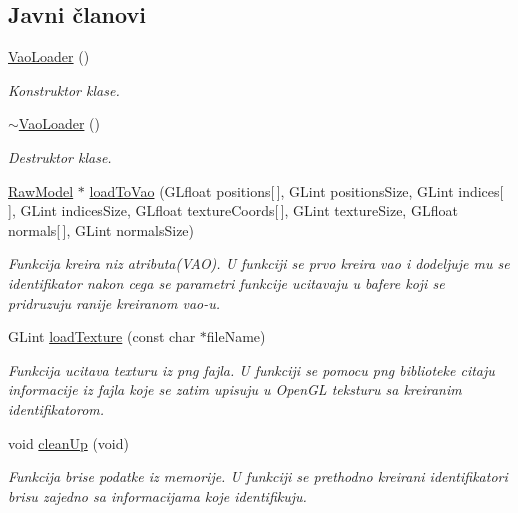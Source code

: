 \subsection*{Javni članovi}
\begin{DoxyCompactItemize}
\item 
\hyperlink{classcore_1_1VaoLoader_ab025be7312c274b9737b19d308bd5845}{Vao\+Loader} ()
\begin{DoxyCompactList}\small\item\em Konstruktor klase. \end{DoxyCompactList}\item 
\hyperlink{classcore_1_1VaoLoader_a1b522bb4b83dbe751783fee04ac712d3}{$\sim$\+Vao\+Loader} ()
\begin{DoxyCompactList}\small\item\em Destruktor klase. \end{DoxyCompactList}\item 
\hyperlink{classmodel_1_1RawModel}{Raw\+Model} $\ast$ \hyperlink{classcore_1_1VaoLoader_a61e0aea1c2f59726a2ea8ba323d32b67}{load\+To\+Vao} (G\+Lfloat positions\mbox{[}$\,$\mbox{]}, G\+Lint positions\+Size, G\+Lint indices\mbox{[}$\,$\mbox{]}, G\+Lint indices\+Size, G\+Lfloat texture\+Coords\mbox{[}$\,$\mbox{]}, G\+Lint texture\+Size, G\+Lfloat normals\mbox{[}$\,$\mbox{]}, G\+Lint normals\+Size)
\begin{DoxyCompactList}\small\item\em Funkcija kreira niz atributa(\+V\+A\+O). U funkciji se prvo kreira vao i dodeljuje mu se identifikator nakon cega se parametri funkcije ucitavaju u bafere koji se pridruzuju ranije kreiranom vao-\/u. \end{DoxyCompactList}\item 
G\+Lint \hyperlink{classcore_1_1VaoLoader_aeefd4de3346c1036d8d7249694fd404d}{load\+Texture} (const char $\ast$file\+Name)
\begin{DoxyCompactList}\small\item\em Funkcija ucitava texturu iz png fajla. U funkciji se pomocu png biblioteke citaju informacije iz fajla koje se zatim upisuju u Open\+GL teksturu sa kreiranim identifikatorom. \end{DoxyCompactList}\item 
void \hyperlink{classcore_1_1VaoLoader_a15a5ec23ffe560ad7117980aaf0d97b9}{clean\+Up} (void)
\begin{DoxyCompactList}\small\item\em Funkcija brise podatke iz memorije. U funkciji se prethodno kreirani identifikatori brisu zajedno sa informacijama koje identifikuju. \end{DoxyCompactList}\end{DoxyCompactItemize}
